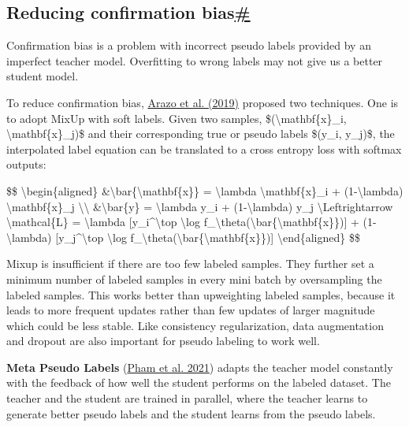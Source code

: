 \subsection{\texorpdfstring{Reducing confirmation bias\hyperref[reducing-confirmation-bias]{\#}}{Reducing confirmation bias\#}}\label{reducing-confirmation-bias}

Confirmation bias is a problem with incorrect pseudo labels provided by an imperfect teacher model. Overfitting to wrong labels may not give us a better student model.

To reduce confirmation bias, \href{https://arxiv.org/abs/1908.02983}{Arazo et al. (2019)} proposed two techniques. One is to adopt MixUp with soft labels. Given two samples, \$(\textbackslash mathbf\{x\}\_i, \textbackslash mathbf\{x\}\_j)\$ and their corresponding true or pseudo labels \$(y\_i, y\_j)\$, the interpolated label equation can be translated to a cross entropy loss with softmax outputs:

\$\$ \textbackslash begin\{aligned\} \&\textbackslash bar\{\textbackslash mathbf\{x\}\} = \textbackslash lambda \textbackslash mathbf\{x\}\_i + (1-\textbackslash lambda) \textbackslash mathbf\{x\}\_j \textbackslash\textbackslash{} \&\textbackslash bar\{y\} = \textbackslash lambda y\_i + (1-\textbackslash lambda) y\_j \textbackslash Leftrightarrow \textbackslash mathcal\{L\} = \textbackslash lambda {[}y\_i\^{}\textbackslash top \textbackslash log f\_\textbackslash theta(\textbackslash bar\{\textbackslash mathbf\{x\}\}){]} + (1-\textbackslash lambda) {[}y\_j\^{}\textbackslash top \textbackslash log f\_\textbackslash theta(\textbackslash bar\{\textbackslash mathbf\{x\}\}){]} \textbackslash end\{aligned\} \$\$

Mixup is insufficient if there are too few labeled samples. They further set a minimum number of labeled samples in every mini batch by oversampling the labeled samples. This works better than upweighting labeled samples, because it leads to more frequent updates rather than few updates of larger magnitude which could be less stable. Like consistency regularization, data augmentation and dropout are also important for pseudo labeling to work well.

\textbf{Meta Pseudo Labels} (\href{https://arxiv.org/abs/2003.10580}{Pham et al. 2021}) adapts the teacher model constantly with the feedback of how well the student performs on the labeled dataset. The teacher and the student are trained in parallel, where the teacher learns to generate better pseudo labels and the student learns from the pseudo labels.

